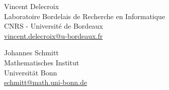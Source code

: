 \documentclass[11pt]{article}
\newcommand{\M}{\ensuremath{\overline{\mathcalorig{M}}}}
\begin{document}






\vspace{+16 pt}
\noindent Vincent Delecroix \\
\noindent Laboratoire Bordelais de Recherche en Informatique \\
\noindent CNRS - Universit\'e de Bordeaux \\
\noindent \href{mailto:vincent.delecroix@u-bordeaux.fr}{vincent.delecroix@u-bordeaux.fr}

\vspace{+16 pt}
\noindent Johannes Schmitt \\
\noindent Mathematisches Institut \\
\noindent Universit\"at Bonn \\
\noindent \href{mailto:schmitt@math.uni-bonn.de}{schmitt@math.uni-bonn.de}
\end{document}
